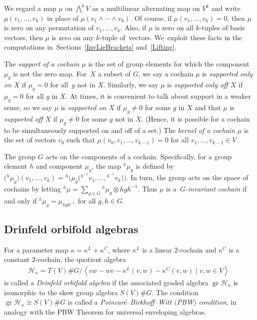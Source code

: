 \documentclass[10pt,a4paper]{amsart}
\numberwithin{equation}{section}
\newcommand{\standout}[1]{\textit{#1}} %
\newcommand{\actby}[1]{{}^{#1}}
\DeclareMathOperator{\gr}{gr}
\begin{document}
We regard a map $\mu$ on $\bigwedge^kV$ as a multilinear alternating map on $V^k$ and write $\mu(v_1,\ldots,v_k)$ in place of $\mu(v_1\wedge\cdots\wedge v_k)$.
Of course, if
$\mu(v_1,\ldots,v_k)=0$, then $\mu$ is zero on any permutation of
$v_1,\ldots,v_k$. Also, if $\mu$ is zero on all $k$-tuples of basis vectors, then $\mu$ is zero on any $k$-tuple of~vectors. We~exploit these facts in the computations in~Sections~\ref{InvLieBrackets} and~\ref{Lifting}.

The \standout{support of a cochain $\mu$} is the set of group elements for which the component $\mu_g$ is not the zero map. For~$X$ a subset of $G$, we say a cochain $\mu$ is \standout{supported only on {\boldmath $X$}} if $\mu_g=0$ for all~$g$ not in $X$. Similarly, we say $\mu$ is
\standout{supported only off {\boldmath $X$}} if $\mu_g=0$ for all $g$ in $X$.
At times, it is convenient to talk about support in a weaker sense, so we say $\mu$ is \standout{supported on {\boldmath $X$}} if $\mu_g\neq0$ for some $g$ in $X$
and that $\mu$ is \standout{supported off {\boldmath $X$}} if $\mu_g\neq0$ for some $g$ not in $X$. (Hence, it is possible for a cochain to be simultaneously supported on and off of a set.)
The \standout{kernel of a cochain $\mu$} is the set of vectors $v_0$ such that $\mu(v_0,v_1,\ldots,v_{k-1})=0$ for all $v_1,\ldots,v_{k-1}\in V$.

The group $G$ acts on the components of a cochain. Specifically, for a group element $h$ and component $\mu_g$, the map
$\actby{h}\mu_g$ is defined by $\big(\actby{h}\mu_g\big)(v_1,\ldots,v_k)=\actby{h}\big(\mu_g\big(\actby{h^{-1}}v_1,\ldots,\actby{h^{-1}}v_k\big)\big)$. In turn, the group acts on the space of cochains by letting $\actby{h}\mu=\sum_{g\in G}\actby{h}\mu_g\otimes hgh^{-1}$. Thus $\mu$ is a~\standout{$G$-invariant cochain} if and only if $\actby{h}\mu_g=\mu_{hgh^{-1}}$ for all $g,h\in G$.

\subsection{Drinfeld orbifold algebras}%
For a parameter map $\kappa=\kappa^L+\kappa^C$, where $\kappa^L$ is a linear $2$-cochain and $\kappa^C$ is a constant $2$-cochain, the quotient algebra
\begin{gather*}
\mathcal{H}_{\kappa}=T(V)\#G/\left\langle vw-wv-\kappa^L(v,w)-\kappa^C(v,w)\mid v,w\in V\right\rangle
\end{gather*}
is called a \standout{Drinfeld orbifold algebra} if the associated graded algebra $\gr\mathcal{H}_{\kappa}$ is isomorphic to the skew group algebra
$S(V)\# G$. The condition $\gr\mathcal{H}_{\kappa}\cong S(V)\# G$ is
called a \standout{Poincar\'e--Birkhoff--Witt $($PBW$)$ condition}, in analogy with
the PBW Theorem for universal enveloping algebras.
\end{document}
